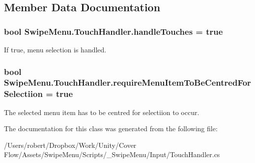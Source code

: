 \subsection{Member Data Documentation}
\hypertarget{class_swipe_menu_1_1_touch_handler_abc83b20a8a5cb8926d36a365332f4bde}{}
\subsubsection[{handle\+Touches}]{\setlength{\rightskip}{0pt plus 5cm}bool Swipe\+Menu.\+Touch\+Handler.\+handle\+Touches = true}\label{class_swipe_menu_1_1_touch_handler_abc83b20a8a5cb8926d36a365332f4bde}


If true, menu selection is handled. 

\hypertarget{class_swipe_menu_1_1_touch_handler_a5087c3be41a592cb074bab02aa08d3a3}{}
\subsubsection[{require\+Menu\+Item\+To\+Be\+Centred\+For\+Selectiion}]{\setlength{\rightskip}{0pt plus 5cm}bool Swipe\+Menu.\+Touch\+Handler.\+require\+Menu\+Item\+To\+Be\+Centred\+For\+Selectiion = true}\label{class_swipe_menu_1_1_touch_handler_a5087c3be41a592cb074bab02aa08d3a3}


The selected menu item has to be centred for selectiion to occur. 



The documentation for this class was generated from the following file\+:\begin{DoxyCompactItemize}
\item 
/\+Users/robert/\+Dropbox/\+Work/\+Unity/\+Cover Flow/\+Assets/\+Swipe\+Menu/\+Scripts/\+\_\+\+Swipe\+Menu/\+Input/Touch\+Handler.\+cs\end{DoxyCompactItemize}
